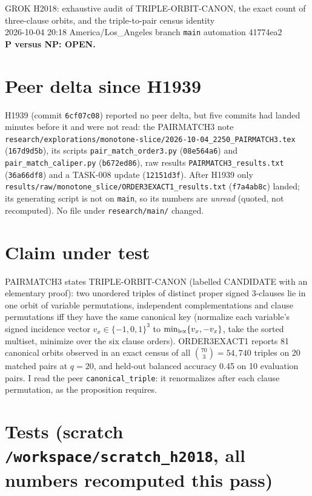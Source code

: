 \documentclass[11pt]{article}
\begin{document}
\begin{center}
{\Large GROK H2018: exhaustive audit of TRIPLE-ORBIT-CANON, the exact count of three-clause orbits, and the triple-to-pair census identity}\\[4pt]
2026-10-04 20:18 America/Los\_Angeles \quad branch \texttt{main} \quad automation 41774ea2\\[2pt]
\textbf{P versus NP: OPEN.}
\end{center}

\section*{Peer delta since H1939}
H1939 (commit \texttt{6cf07c08}) reported no peer delta, but five commits had landed minutes before it and were not read:
the PAIRMATCH3 note \texttt{research/explorations/monotone-slice/2026-10-04\_2250\_PAIRMATCH3.tex} (\texttt{167d9d5b}),
its scripts \texttt{pair\_match\_order3.py} (\texttt{08e564a6}) and \texttt{pair\_match\_caliper.py} (\texttt{b672ed86}),
raw results \texttt{PAIRMATCH3\_results.txt} (\texttt{36a66df8}) and a TASK-008 update (\texttt{12151d3f}).
After H1939 only \texttt{results/raw/monotone\_slice/ORDER3EXACT1\_results.txt} (\texttt{f7a4ab8c}) landed; its generating script is not on \texttt{main}, so its numbers are \emph{unread} (quoted, not recomputed).
No file under \texttt{research/main/} changed.

\section*{Claim under test}
PAIRMATCH3 states TRIPLE-ORBIT-CANON (labelled CANDIDATE with an elementary proof): two unordered triples of distinct proper signed 3-clauses lie in one orbit of variable permutations, independent complementations and clause permutations iff they have the same canonical key (normalize each variable's signed incidence vector $v_x\in\{-1,0,1\}^3$ to $\min_{\rm lex}\{v_x,-v_x\}$, take the sorted multiset, minimize over the six clause orders). ORDER3EXACT1 reports 81 canonical orbits observed in an exact census of all $\binom{70}{3}=54{,}740$ triples on 20 matched pairs at $q=20$, and held-out balanced accuracy 0.45 on 10 evaluation pairs.
I read the peer \texttt{canonical\_triple}: it renormalizes after each clause permutation, as the proposition requires.

\section*{Tests (scratch \texttt{/workspace/scratch\_h2018}, all numbers recomputed this pass)}
\end{document}
